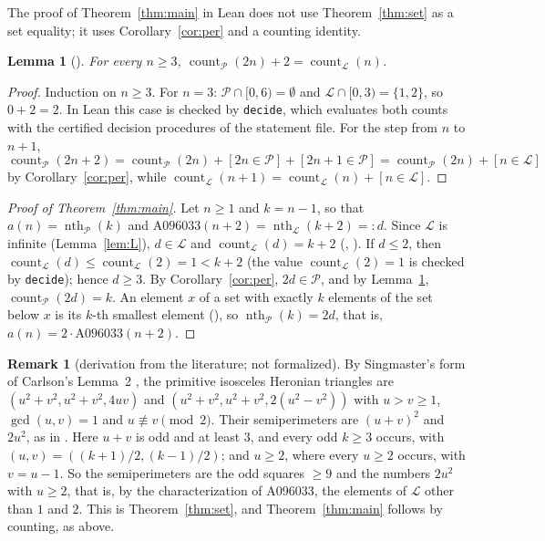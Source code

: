 \documentclass[11pt]{amsart}
\theoremstyle{plain}
\newtheorem{lemma}[theorem]{Lemma}
\theoremstyle{definition}
\newtheorem{remark}[theorem]{Remark}
\newcommand{\code}[1]{\texttt{#1}}
\newcommand{\Per}{\mathcal{P}}
\newcommand{\Leg}{\mathcal{L}}
\DeclareMathOperator{\cnt}{count}
\DeclareMathOperator{\nth}{nth}
\begin{document}
The proof of Theorem~\ref{thm:main} in Lean does not use Theorem~\ref{thm:set} as a set equality; it uses Corollary~\ref{cor:per} and a counting identity.

\begin{lemma}[]\label{lem:count}
For every $n\ge3$, $\cnt_\Per(2n)+2=\cnt_\Leg(n)$.
\end{lemma}

\begin{proof}
Induction on $n\ge3$. For $n=3$: $\Per\cap[0,6)=\emptyset$ and $\Leg\cap[0,3)=\{1,2\}$, so $0+2=2$. In Lean this case is checked by \code{decide}, which evaluates both counts with the certified decision procedures of the statement file. For the step from $n$ to $n+1$,
\[
  \cnt_\Per(2n+2)=\cnt_\Per(2n)+[2n\in\Per]+[2n+1\in\Per]=\cnt_\Per(2n)+[n\in\Leg]
\]
by Corollary~\ref{cor:per}, while $\cnt_\Leg(n+1)=\cnt_\Leg(n)+[n\in\Leg]$.
\end{proof}

\begin{proof}[Proof of Theorem~\ref{thm:main}]
Let $n\ge1$ and $k=n-1$, so that $a(n)=\nth_\Per(k)$ and $\mathrm{A096033}(n+2)=\nth_\Leg(k+2)=:d$. Since $\Leg$ is infinite (Lemma~\ref{lem:L}), $d\in\Leg$ and $\cnt_\Leg(d)=k+2$ (, ). If $d\le2$, then $\cnt_\Leg(d)\le\cnt_\Leg(2)=1<k+2$ (the value $\cnt_\Leg(2)=1$ is checked by \code{decide}); hence $d\ge3$. By Corollary~\ref{cor:per}, $2d\in\Per$, and by Lemma~\ref{lem:count}, $\cnt_\Per(2d)=k$. An element $x$ of a set with exactly $k$ elements of the set below $x$ is its $k$-th smallest element (), so $\nth_\Per(k)=2d$, that is, $a(n)=2\cdot\mathrm{A096033}(n+2)$.
\end{proof}

\begin{remark}[derivation from the literature; not formalized]\label{rem:lit}
By Singmaster's form of Carlson's Lemma~2 \cite{Singmaster}, the primitive isosceles Heronian triangles are $(u^2+v^2,u^2+v^2,4uv)$ and $(u^2+v^2,u^2+v^2,2(u^2-v^2))$ with $u>v\ge1$, $\gcd(u,v)=1$ and $u\not\equiv v\pmod2$. Their semiperimeters are $(u+v)^2$ and $2u^2$, as in \cite{MSEa}. Here $u+v$ is odd and at least $3$, and every odd $k\ge3$ occurs, with $(u,v)=((k+1)/2,(k-1)/2)$; and $u\ge2$, where every $u\ge2$ occurs, with $v=u-1$. So the semiperimeters are the odd squares $\ge9$ and the numbers $2u^2$ with $u\ge2$, that is, by the characterization of A096033, the elements of $\Leg$ other than $1$ and $2$. This is Theorem~\ref{thm:set}, and Theorem~\ref{thm:main} follows by counting, as above.
\end{remark}
\end{document}
